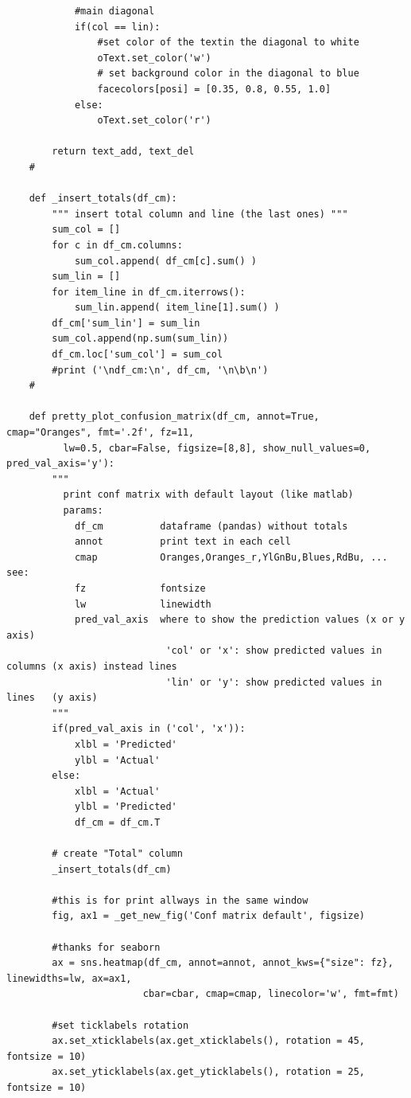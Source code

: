 \begin{verbatim}
            #main diagonal
            if(col == lin):
                #set color of the textin the diagonal to white
                oText.set_color('w')
                # set background color in the diagonal to blue
                facecolors[posi] = [0.35, 0.8, 0.55, 1.0]
            else:
                oText.set_color('r')

        return text_add, text_del
    #

    def _insert_totals(df_cm):
        """ insert total column and line (the last ones) """
        sum_col = []
        for c in df_cm.columns:
            sum_col.append( df_cm[c].sum() )
        sum_lin = []
        for item_line in df_cm.iterrows():
            sum_lin.append( item_line[1].sum() )
        df_cm['sum_lin'] = sum_lin
        sum_col.append(np.sum(sum_lin))
        df_cm.loc['sum_col'] = sum_col
        #print ('\ndf_cm:\n', df_cm, '\n\b\n')
    #

    def pretty_plot_confusion_matrix(df_cm, annot=True, cmap="Oranges", fmt='.2f', fz=11,
          lw=0.5, cbar=False, figsize=[8,8], show_null_values=0, pred_val_axis='y'):
        """
          print conf matrix with default layout (like matlab)
          params:
            df_cm          dataframe (pandas) without totals
            annot          print text in each cell
            cmap           Oranges,Oranges_r,YlGnBu,Blues,RdBu, ... see:
            fz             fontsize
            lw             linewidth
            pred_val_axis  where to show the prediction values (x or y axis)
                            'col' or 'x': show predicted values in columns (x axis) instead lines
                            'lin' or 'y': show predicted values in lines   (y axis)
        """
        if(pred_val_axis in ('col', 'x')):
            xlbl = 'Predicted'
            ylbl = 'Actual'
        else:
            xlbl = 'Actual'
            ylbl = 'Predicted'
            df_cm = df_cm.T

        # create "Total" column
        _insert_totals(df_cm)

        #this is for print allways in the same window
        fig, ax1 = _get_new_fig('Conf matrix default', figsize)

        #thanks for seaborn
        ax = sns.heatmap(df_cm, annot=annot, annot_kws={"size": fz}, linewidths=lw, ax=ax1,
                        cbar=cbar, cmap=cmap, linecolor='w', fmt=fmt)

        #set ticklabels rotation
        ax.set_xticklabels(ax.get_xticklabels(), rotation = 45, fontsize = 10)
        ax.set_yticklabels(ax.get_yticklabels(), rotation = 25, fontsize = 10)


\end{verbatim}
